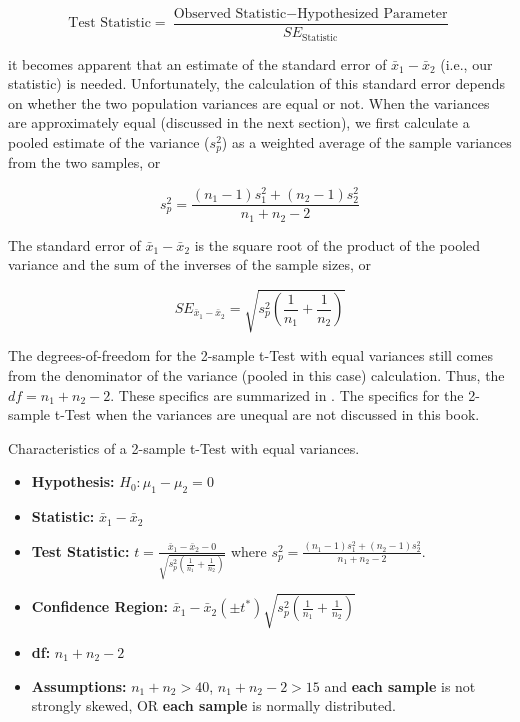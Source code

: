\documentclass[10pt,openany]{book}\usepackage[]{graphicx}\usepackage[]{color}
\begin{document}
\[ \text{Test Statistic} = \frac{\text{Observed Statistic}-\text{Hypothesized Parameter}}{SE_{\text{Statistic}}} \]

it becomes apparent that an estimate of the standard error of $\bar{x}_{1}-\bar{x}_{2}$ (i.e., our statistic) is needed.  Unfortunately, the calculation of this standard error depends on whether the two population variances are equal or not.  When the variances are approximately equal (discussed in the next section), we first calculate a pooled estimate of the variance ($s_{p}^{2}$) as a weighted average of the sample variances from the two samples, or

\[s_{p}^{2}=\frac{(n_{1}-1)s_{1}^{2}+(n_{2}-1)s_{2}^{2}}{n_{1}+n_{2}-2} \]


The standard error of $\bar{x}_{1}-\bar{x}_{2}$ is the square root of the product of the pooled variance and the sum of the inverses of the sample sizes, or

\[ SE_{\bar{x}_{1}-\bar{x}_{2}}= \sqrt{s_{p}^{2}\left(\frac{1}{n_{1}}+\frac{1}{n_{2}} \right)}  \]

The degrees-of-freedom for the 2-sample t-Test with equal variances still comes from the denominator of the variance (pooled in this case) calculation. Thus, the $df=n_{1}+n_{2}-2$.  These specifics are summarized in . The specifics for the 2-sample t-Test when the variances are unequal are not discussed in this book.

\begin{table}[htbp]
  \caption{Characteristics of a 2-sample t-Test with equal variances.}
  \label{tab:2tspec}
    \begin{itemize}
      \item \textbf{Hypothesis:} $H_{0}:\mu_{1}-\mu_{2}=0$
      \item \textbf{Statistic:} $\bar{x}_{1}-\bar{x}_{2}$
      \item \textbf{Test Statistic:} $t=\frac{\bar{x}_{1}-\bar{x}_{2}-0}{\sqrt{s_{p}^{2}\left(\frac{1}{n_{1}}+\frac{1}{n_{2}} \right)}}$ where $s_{p}^{2}=\frac{(n_{1}-1)s_{1}^{2}+(n_{2}-1)s_{2}^{2}}{n_{1}+n_{2}-2}$.
      \item \textbf{Confidence Region:} $\bar{x}_{1}-\bar{x}_{2}(\pm t^{*})\sqrt{s_{p}^{2}\left(\frac{1}{n_{1}}+\frac{1}{n_{2}} \right)}$
      \item \textbf{df:} $n_{1}+n_{2}-2$
      \item \textbf{Assumptions:} $n_{1}+n_{2}>40$, $n_{1}+n_{2}-2>15$ and \textbf{each sample} is not strongly skewed, OR \textbf{each sample} is normally distributed.
    \end{itemize}
\end{table}
\end{document}
